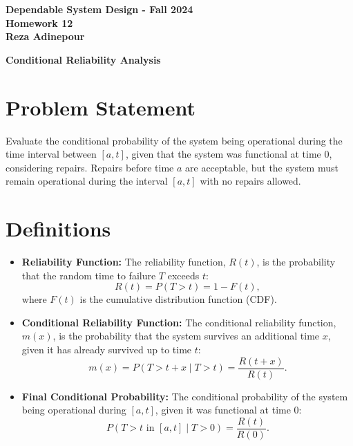 \documentclass[12pt]{article}
\begin{document}
	
	\begin{center}
		\Large\textbf{Dependable System Design - Fall 2024} \\
		\large\textbf{Homework 12} \\
		\normalsize\textbf{Reza Adinepour}
	\end{center}
	
	\vspace{1cm}
	
	\begin{center}
		\large\textbf{Conditional Reliability Analysis}\\
	\end{center}
	
	\section*{Problem Statement}
	Evaluate the conditional probability of the system being operational during the time interval between \([a, t]\), given that the system was functional at time 0, considering repairs. Repairs before time \(a\) are acceptable, but the system must remain operational during the interval \([a, t]\) with no repairs allowed.
	
	
	\section*{Definitions}
	\begin{itemize}
		\item \textbf{Reliability Function:} The reliability function, \(R(t)\), is the probability that the random time to failure \(T\) exceeds \(t\):
		\begin{equation}
			R(t) = P(T > t) = 1 - F(t),
		\end{equation}
		where \(F(t)\) is the cumulative distribution function (CDF).
		
		\item \textbf{Conditional Reliability Function:} The conditional reliability function, \(m(x)\), is the probability that the system survives an additional time \(x\), given it has already survived up to time \(t\):
		\begin{equation}
			m(x) = P(T > t + x \mid T > t) = \frac{R(t + x)}{R(t)}.
		\end{equation}
		
		\item \textbf{Final Conditional Probability:} The conditional probability of the system being operational during \([a, t]\), given it was functional at time 0:
		\begin{equation}
			P(T > t \text{ in } [a, t] \mid T > 0) = \frac{R(t)}{R(0)}.
		\end{equation}
	\end{itemize}
	
\end{document}
